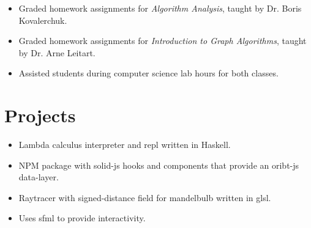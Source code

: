 \documentclass[11pt, a4paper]{article}
\begin{document}
\noindent
{
  \hfill
}

\noindent
{
  \hfill
}
\vspace{-0.08in}
\begin{itemize}
  \item Graded homework assignments for {\it Algorithm Analysis}, taught by Dr. Boris Kovalerchuk.
        \vspace{-0.1in}
  \item Graded homework assignments for {\it Introduction to Graph Algorithms}, taught by Dr. Arne Leitart.
        \vspace{-0.1in}
  \item Assisted students during computer science lab hours for both classes.
\end{itemize}

\vspace{-0.2in}

\section*{Projects}
\noindent
{
  \hfill
}
\vspace{-0.1in}
\begin{itemize}
  \item Lambda calculus interpreter and repl written in Haskell.
\end{itemize}
\vspace{-0.05in}

\noindent
{
  \hfill
}
\vspace{-0.1in}
\begin{itemize}
  \item NPM package with solid-js hooks and components that provide an oribt-js data-layer.
\end{itemize}
\vspace{-0.05in}

\noindent
{
  \hfill
}
\vspace{-0.1in}
\begin{itemize}
  \item Raytracer with signed-distance field for mandelbulb written in glsl.
        \vspace{-0.1in}
  \item Uses sfml to provide interactivity.
\end{itemize}
\end{document}
